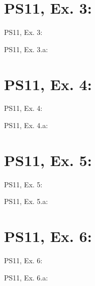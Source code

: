 \section{PS11, Ex. 3: }

\begin{frame}{PS11, Ex. 3: }
    \begin{multicols}{2}
      \vfill\null\columnbreak
      \vfill
    \end{multicols}
\end{frame}

\begin{frame}{PS11, Ex. 3.a: }
    \begin{multicols}{2}
      \vfill\null\columnbreak
      \vfill\null
    \end{multicols}
\end{frame}



\section{PS11, Ex. 4: }

\begin{frame}{PS11, Ex. 4: }
    \begin{multicols}{2}
      \vfill\null\columnbreak
      \vfill\null
    \end{multicols}
\end{frame}

\begin{frame}{PS11, Ex. 4.a: }
    \begin{multicols}{2}
      \vfill\null\columnbreak
      \vfill\null
    \end{multicols}
\end{frame}



\section{PS11, Ex. 5: }

\begin{frame}{PS11, Ex. 5: }
    \begin{multicols}{2}
      \vfill\null\columnbreak
      \vfill
    \end{multicols}
\end{frame}

\begin{frame}{PS11, Ex. 5.a: }
    \begin{multicols}{2}
      \vfill\null\columnbreak
      \vfill\null
    \end{multicols}
\end{frame}



\section{PS11, Ex. 6: }

\begin{frame}{PS11, Ex. 6: }
    \begin{multicols}{2}
      \vfill\null\columnbreak
      \vfill\null
    \end{multicols}
\end{frame}

\begin{frame}{PS11, Ex. 6.a: }
    \begin{multicols}{2}
      \vfill\null\columnbreak
      \vfill\null
    \end{multicols}
\end{frame}
